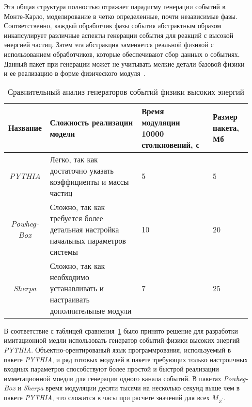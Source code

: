 Эта общая структура полностью отражает парадигму генерации событий в Монте-Карло,
моделирование в четко определенные, почти независимые фазы. Соответственно, каждый обработчик фазы события абстрактным образом инкапсулирует различные аспекты генерации события для реакций с высокой энергией частиц.
Затем эта абстракция заменяется реальной физикой с использованием обработчиков, которые обеспечивают сбор данных о событиях. Данный пакет при генерации может не учитывать мелкие детали базовой физики и ее реализацию в форме физического модуля~\cite{review-sherpa}.

\begin{table}[h!]
	\begin{flushleft}
		\caption{Сравнительный анализ генераторов событий физики
			высоких энергий}
		\label{tab:table1}
		\begin{tabular}{ | c | p{5cm} | p{4cm} | p{4cm} |}
			\hline
			Название & Сложность реализации модели & Время модуляции 10000 столкновений, с & Размер пакета, Мб \\ \hline
			\textit{PYTHIA} & Легко, так как достаточно указать коэффициенты и массы частиц & \hspace{2cm}5 & \hspace{2cm}5 \\ \hline
			\textit{Powheg-Box} & Сложно, так как требуется более детальная настройка начальных параметров системы & \hspace{2cm}10 & \hspace{2cm}20 \\ \hline
			\textit{Sherpa} & Сложно, так как необходимо устанавливать и настраивать дополнительные модули & \hspace{2cm}7 & \hspace{2cm}25 \\
			\hline
		\end{tabular}
	\end{flushleft}
\end{table}

В соответствие с таблицей сравнения~\ref{tab:table1} было принято решение для разработки имитационной медли использовать генератор событий физики
высоких энергий \textit{PYTHIA}. Объектно-орентированый язык программрования, используемый в пакете \textit{PYTHIA}, и ряд готовых модулей в пакете требующих только настроичных входных параметров способствуют более простой и быстрой реализации имметационной моедли для генерации одного канала событий. В пакетах \textit{Powheg-Box} и \textit{Sherpa} время модуляции десяти тысячи на несколько секунд выше чем в пакете \textit{PYTHIA}, что сложится в часы при расчете значений для всех ${M}_{{Z}^{\prime}}$.


